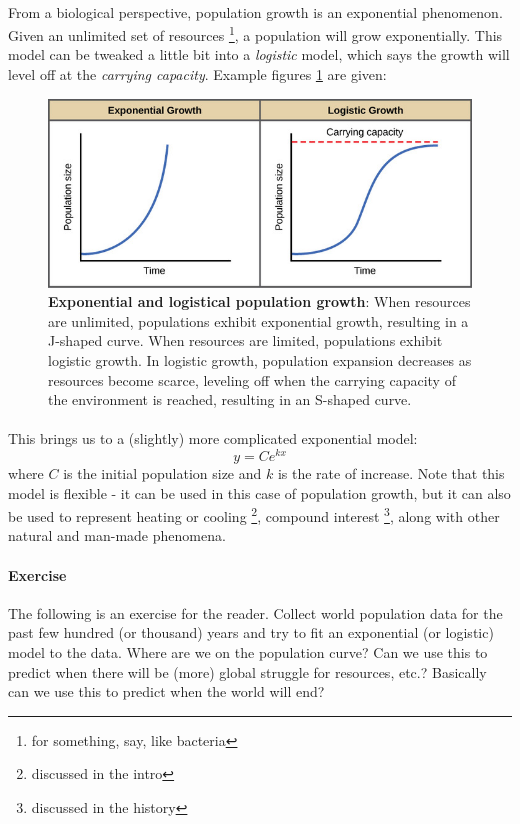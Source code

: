 \documentclass{cup-pan}
\begin{document}
\paragraph{}
From a biological perspective, population growth is an exponential phenomenon. Given an unlimited set of resources \footnote{for something, say, like bacteria}, a population will grow exponentially. This model can be tweaked a little bit into a \textit{logistic} model, which says the growth will level off at the \textit{carrying capacity}. Example figures \ref{fig:pop_growth} are given:

\begin{figure}[h!]
 \includegraphics[width=\linewidth]{population_growth.jpeg}

\caption{\textbf{Exponential and logistical population growth}: When resources are unlimited, populations exhibit exponential growth, resulting in a J-shaped curve. When resources are limited, populations exhibit logistic growth. In logistic growth, population expansion decreases as resources become scarce, leveling off when the carrying capacity of the environment is reached, resulting in an S-shaped curve.}
\label{fig:pop_growth}
\end{figure}

\paragraph{} This brings us to a (slightly) more complicated exponential model: $$y = C\textit{e}^{kx}$$
where $C$ is the initial population size and $k$ is the rate of increase. Note that this model is flexible - it can be used in this case of population growth, but it can also be used to represent heating or cooling \footnote{discussed in the intro}, compound interest \footnote{discussed in the history}, along with other natural and man-made phenomena.

\paragraph{Exercise} The following is an exercise for the reader. Collect world population data for the past few hundred (or thousand) years and try to fit an exponential (or logistic) model to the data. Where are we on the population curve? Can we use this to predict when there will be (more) global struggle for resources, etc.? Basically can we use this to predict when the world will end?
\end{document}
